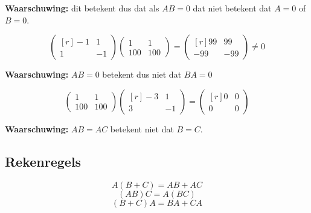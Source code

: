 \textbf{Waarschuwing:} dit betekent dus dat als $AB = 0$ dat niet betekent dat $A=0$ of $B=0$.

\[ \begin{pmatrix*}[r] -1 & 1 \\ 1 & -1 \end{pmatrix*} \begin{pmatrix} 1 & 1 \\ 100 & 100 \end{pmatrix} = \begin{pmatrix*}[r] 99 & 99 \\ -99 & -99 \end{pmatrix*} \neq 0 \]

\textbf{Waarschuwing:} $AB=0$ betekent dus niet dat $BA=0$

\[ \begin{pmatrix} 1 & 1 \\ 100 & 100 \end{pmatrix} \begin{pmatrix*}[r] -3 & 1 \\ 3 & -1 \end{pmatrix*} = \begin{pmatrix*}[r] 0 & 0 \\ 0 & 0 \end{pmatrix*} \]

\textbf{Waarschuwing:} $AB = AC$ betekent niet dat $B=C$.

\subsection{Rekenregels}
\[ A(B+C) = AB + AC \]
\[ (AB)C = A(BC) \]
\[ (B+C)A = BA + CA \]

